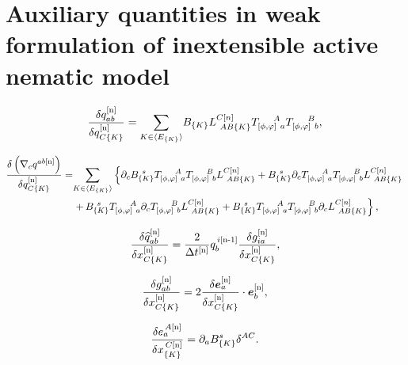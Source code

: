 \section{Auxiliary quantities in weak formulation of inextensible active nematic model}

\begin{equation} \label{B.21}
	\frac{\delta q^{[\textup{n}]}_{ab}}{\delta q_{C\{K\}}^{[\textup{n}]}} = \underset{K \in \langle E_{\{K\}} \rangle}{\mathrm{\sum}} B_{\{K\}}L_{~AB\{ K \}}^{C[n]} T_{[\phi,\varphi]~a}^{\quad \,\, A}  T_{[\phi,\varphi]~b}^{\quad \,\, B} ,
\end{equation}


\begin{align} \label{B.22}
	\frac{\delta \left( \nabla_c q^{ab [\textup{n}]}\right)}{\delta q_{C\{K\}}^{[\textup{n}]}}  = & \underset{K \in \langle E_{\{K\}} \rangle}{\mathrm{\sum}}\left\{\partial_cB_{\{K\}}^{~s} T_{[\phi,\varphi]~a}^{~~~~A} T_{[\phi,\varphi]~b}^{~~~~B} L_{~AB\{K\}}^{C[n]}  + B_{\{K\}}^{~s} \partial_cT_{[\phi,\varphi]~a}^{~~~~A} \nonumber T_{[\phi,\varphi]~b}^{~~~~B}  L_{~AB\{K\}}^{C[n]}  \right. \\
	&\left.+\,B_{\{K\}}^{~s} T_{[\phi,\varphi]~a}^{~~~~A} \partial_cT_{[\phi,\varphi]~b}^{~~~~B}  L_{~AB\{K\}}^{C[n]}  +B_{\{K\}}^{~s}  T_{[\phi,\varphi]~a}^{~~~~A} T_{[\phi,\varphi]~b}^{~~~~B}\partial_c  L_{~AB\{K\}}^{C[n]} \right\}, 
\end{align}

\begin{equation} \label{B.23}
	\frac{\delta \widehat{q}_{ab}^{[\textup{n}]}}{\delta x_{C\{ K\}}^{[\textup{n}]}} =  \frac{2}{\Delta t^{[\textup{n}]}} q_{b}^{\,i[\textup{n-1}]} \frac{\delta g^{[\textup{n}]}_{ia}}{\delta  x_{C{\{K\}}}^{[\textup{n}]}} ,
\end{equation}
 
\begin{equation} \label{B.24}
	\frac{\delta g^{[\textup{n}]}_{ab}}{\delta  x_{C{\{K\}}}^{[\textup{n}]}} = 2 \frac{\delta \bm{e}_a^{[\textup{n}]}}{\delta   x_{C\{K\}}^{[\textup{n}]}}   \cdot \bm{e}_b^{[\textup{n}]},
\end{equation}

\begin{equation} \label{B.25}
	\frac{\delta e_{a}^{\,A[\textup{n}]}}{\delta  x_{\{K\}}^{\,C[\textup{n}]}} =  \partial_{a} B^s_{\{K\}}  \delta^{AC}.
\end{equation}





